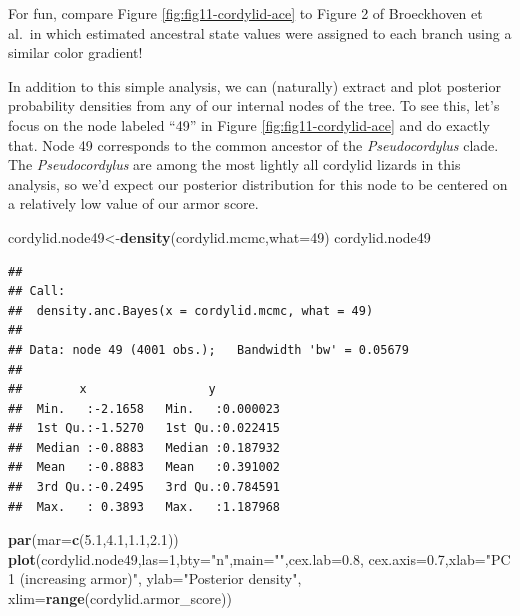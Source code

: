 \documentclass[fleqn,10pt,lineno]{wlpeerj} %
\newenvironment{Shaded}{\begin{snugshade}}{\end{snugshade}}
\newcommand{\AttributeTok}[1]{\textcolor[rgb]{0.13,0.29,0.53}{#1}}
\newcommand{\DecValTok}[1]{\textcolor[rgb]{0.00,0.00,0.81}{#1}}
\newcommand{\FloatTok}[1]{\textcolor[rgb]{0.00,0.00,0.81}{#1}}
\newcommand{\FunctionTok}[1]{\textcolor[rgb]{0.13,0.29,0.53}{\textbf{#1}}}
\newcommand{\NormalTok}[1]{#1}
\newcommand{\OtherTok}[1]{\textcolor[rgb]{0.56,0.35,0.01}{#1}}
\newcommand{\StringTok}[1]{\textcolor[rgb]{0.31,0.60,0.02}{#1}}
\begin{document}
For fun, compare Figure \ref{fig:fig11-cordylid-ace} to Figure 2 of Broeckhoven et al.~in which estimated ancestral state values were assigned to each branch using a similar color gradient!

In addition to this simple analysis, we can (naturally) extract and plot posterior probability densities from any of our internal nodes of the tree. To see this, let's focus on the node labeled ``49'' in Figure \ref{fig:fig11-cordylid-ace} and do exactly that. Node 49 corresponds to the common ancestor of the \emph{Pseudocordylus} clade. The \emph{Pseudocordylus} are among the most lightly all cordylid lizards in this analysis, so we'd expect our posterior distribution for this node to be centered on a relatively low value of our armor score.

\begin{Shaded}
\begin{Highlighting}[]
\NormalTok{cordylid.node49}\OtherTok{\textless{}{-}}\FunctionTok{density}\NormalTok{(cordylid.mcmc,}\AttributeTok{what=}\DecValTok{49}\NormalTok{)}
\NormalTok{cordylid.node49}
\end{Highlighting}
\end{Shaded}

\begin{verbatim}
## 
## Call:
##  density.anc.Bayes(x = cordylid.mcmc, what = 49)
## 
## Data: node 49 (4001 obs.);   Bandwidth 'bw' = 0.05679
## 
##        x                 y           
##  Min.   :-2.1658   Min.   :0.000023  
##  1st Qu.:-1.5270   1st Qu.:0.022415  
##  Median :-0.8883   Median :0.187932  
##  Mean   :-0.8883   Mean   :0.391002  
##  3rd Qu.:-0.2495   3rd Qu.:0.784591  
##  Max.   : 0.3893   Max.   :1.187968
\end{verbatim}

\begin{Shaded}
\begin{Highlighting}[]
\FunctionTok{par}\NormalTok{(}\AttributeTok{mar=}\FunctionTok{c}\NormalTok{(}\FloatTok{5.1}\NormalTok{,}\FloatTok{4.1}\NormalTok{,}\FloatTok{1.1}\NormalTok{,}\FloatTok{2.1}\NormalTok{))}
\FunctionTok{plot}\NormalTok{(cordylid.node49,}\AttributeTok{las=}\DecValTok{1}\NormalTok{,}\AttributeTok{bty=}\StringTok{"n"}\NormalTok{,}\AttributeTok{main=}\StringTok{""}\NormalTok{,}\AttributeTok{cex.lab=}\FloatTok{0.8}\NormalTok{,}
  \AttributeTok{cex.axis=}\FloatTok{0.7}\NormalTok{,}\AttributeTok{xlab=}\StringTok{"PC 1 (increasing armor)"}\NormalTok{,}
  \AttributeTok{ylab=}\StringTok{"Posterior density"}\NormalTok{,}
  \AttributeTok{xlim=}\FunctionTok{range}\NormalTok{(cordylid.armor\_score))}
\end{Highlighting}
\end{Shaded}
\end{document}
